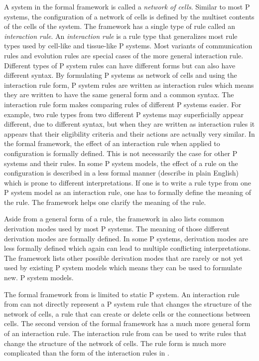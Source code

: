 \documentclass[a4paper]{article}
\theoremstyle{definition}
\begin{document}
A system in the formal framework is called a \emph{network of cells}. Similar to most P systems, the 
configuration of a network of cells is defined by the multiset contents of the cells of the system.
The framework has a single type of rule called an \emph{interaction rule}. An \emph{interaction 
rule} is a rule type that generalizes most rule types used by cell-like and tissue-like P systems. 
Most variants of communication rules and evolution rules are special cases of the more general 
interaction rule. Different types of P system rules can have different forms but can also have
different syntax. By formulating P systems as network of cells and using the interaction rule form,
P system rules are written as interaction rules which means they are written to have the same
general form and a common syntax. The interaction rule form makes comparing rules of different P 
systems easier. For example, two rule types from two different P systems may superficially appear 
different, due to different syntax,  but when they are written as interaction rules it appears that 
their eligibility criteria and their actions are actually very similar. In the formal framework, the 
effect of an interaction rule when applied to configuration is formally defined. This is not 
necessarily the case for other P systems and their rules. In some P system models, the effect of a 
rule on the configuration is described in a less formal manner (describe in plain English) which is 
prone to different interpretations. If one is to write a rule type from one P system model as an
interaction rule, one has to formally define the meaning of the rule. The framework helps one 
clarify the meaning of the rule.

Aside from a general form of a rule, the framework in \cite{freund-2007-ff-1} also lists common
derivation modes used by most P systems. The meaning of those different derivation modes are 
formally defined. In some P systems, derivation modes are less formally defined which again can lead 
to multiple conflicting interpretations. The framework lists other possible derivation modes that
are rarely or not yet used by existing P system models which means they can be used to formulate new.
P system models.
 
The formal framework from \cite{freund-2007-ff-1} is limited to static P system. An interaction rule
from \cite{freund-2007-ff-1} can not directly represent a P system rule that changes the structure
of the network of cells, a rule that can create or delete cells or the connections between cells. 
The second version of the formal framework \cite{freund-2013-ff-2} has a much more general form of 
an interaction rule. The interaction rule from \cite{freund-2013-ff-2} can be used to write rules 
that change the structure of the network of cells. The rule form is much more complicated than the 
form of the interaction rules in \cite{freund-2007-ff-1}.
\end{document}
